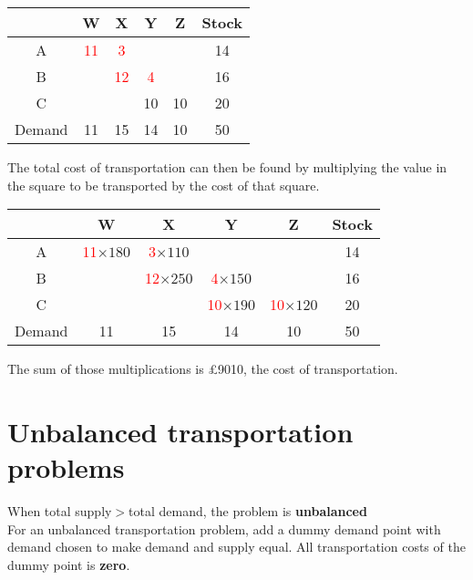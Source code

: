 \documentclass{article}[18pt]
\newcommand{\cred}[1]{\color{red}#1}
\begin{document}
\begin{center}
\begin{tabular}{ |c|c|c|c|c|c| }
\hline
&W&X&Y&Z&Stock\\
\hline
A&\textcolor{red}{11}&\textcolor{red}{3}&&&14\\
\hline
B&&\textcolor{red}{12}&\textcolor{red}{4}&&16\\
\hline
C&&&\cred{10}&\cred{10}&20\\
\hline
Demand&11&15&14&10&50\\ 
\hline
\end{tabular}
\end{center}
\newpage
The total cost of transportation can then be found by multiplying the value in the square to be transported by the cost of that square.
\begin{center}
\begin{tabular}{ |c|c|c|c|c|c| }
\hline
&W&X&Y&Z&Stock\\
\hline
A&\textcolor{red}{11}$\times180$&\textcolor{red}{3}$\times110$&&&14\\
\hline
B&&\textcolor{red}{12}$\times250$&\textcolor{red}{4}$\times150$&&16\\
\hline
C&&&\textcolor{red}{10}$\times190$&\textcolor{red}{10}$\times120$&20\\
\hline
Demand&11&15&14&10&50\\ 
\hline
\end{tabular}
\end{center}
The sum of those multiplications is £9010, the cost of transportation.
\section{Unbalanced transportation problems}
When total supply$>$total demand, the problem is \textbf{unbalanced}\\
For an unbalanced transportation problem, add a dummy demand point with demand chosen to make demand and supply equal. All transportation costs of the dummy point is \textbf{zero}.
\end{document}
